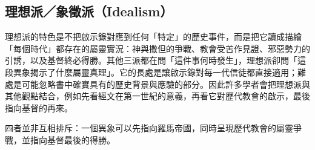\subsection*{理想派／象徵派（Idealism）}
理想派的特色是不把啟示錄對應到任何「特定」的歷史事件，而是把它讀成描繪「每個時代」都存在的屬靈實況：神與撒但的爭戰、教會受苦作見證、邪惡勢力的引誘，以及基督終必得勝。其他三派都在問「這件事何時發生」，理想派卻問「這段異象揭示了什麼屬靈真理」。它的長處是讓啟示錄對每一代信徒都直接適用；難處是可能忽略書中確實具有的歷史背景與應驗的部分。因此許多學者會把理想派與其他觀點結合，例如先看經文在第一世紀的意義，再看它對歷代教會的啟示，最後指向基督的再來。

四者並非互相排斥：一個異象可以先指向羅馬帝國，同時呈現歷代教會的屬靈爭戰，並指向基督最後的得勝。
